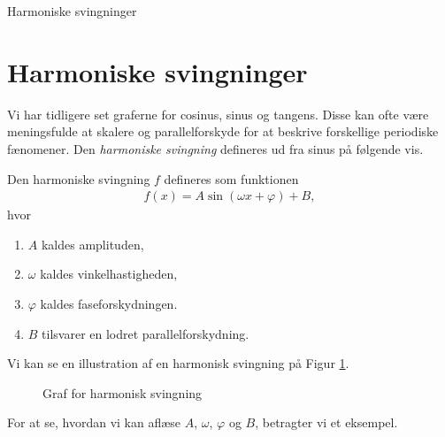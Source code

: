 
\begin{center}
\Huge
	Harmoniske svingninger
\end{center}
\section*{Harmoniske svingninger}

Vi har tidligere set graferne for cosinus, sinus og tangens. Disse kan ofte være meningsfulde at skalere og parallelforskyde for at beskrive forskellige periodiske fænomener. Den \textit{harmoniske svingning} defineres ud fra sinus på følgende vis. 
\begin{defn}
	Den harmoniske svingning $f$ defineres som funktionen
	\begin{align*}
		f(x) = A\sin(\omega x + \varphi) + B,
	\end{align*}
	hvor
	\begin{enumerate}[label=$\cdot$]
		\item $A$ kaldes amplituden,
		\item $\omega$ kaldes vinkelhastigheden, 
		\item $\varphi$ kaldes faseforskydningen.
		\item $B$ tilsvarer en lodret parallelforskydning.
	\end{enumerate}
\end{defn}
Vi kan se en illustration af en harmonisk svingning på Figur \ref{fig:harmonisk}.
\begin{figure}[H]
	\centering
	\caption{Graf for harmonisk svingning}
	\label{fig:harmonisk}
\end{figure}
For at se, hvordan vi kan aflæse $A$, $\omega$, $\varphi$ og $B$, betragter vi et eksempel.
